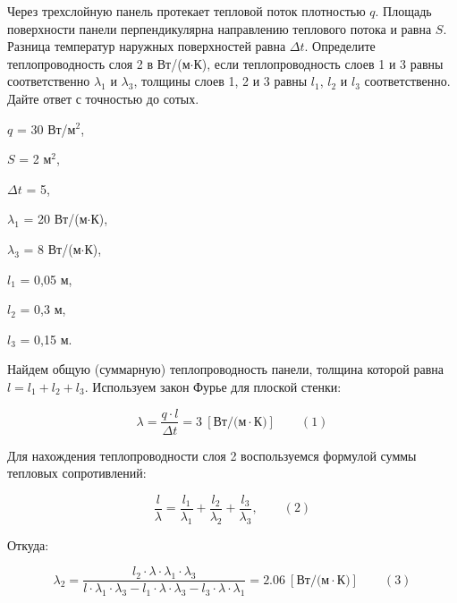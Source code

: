 

Через трехслойную панель протекает тепловой поток плотностью
$q$. Площадь поверхности
панели перпендикулярна направлению теплового потока и равна $S$. Разница температур наружных
поверхностей равна $\Delta t$. Определите
теплопроводность слоя 2 в Вт/(м$\cdot$К), если теплопроводность слоев 1 и 3 равны соответственно
$\lambda_1$ и $\lambda_3$, толщины слоев 1, 2 и 3 равны $l_1$, $l_2$ и $l_3$ соответственно. 
Дайте ответ с точностью до сотых.

$q$ = 30 Вт/м$^2$, 

$S$ = 2 м$^2$, 

$\Delta t$ = 5, 

$\lambda_1$ = 20 Вт/(м$\cdot$К),

$\lambda_3$ = 8 Вт/(м$\cdot$К), 

$l_1$ = 0,05 м, 

$l_2$ = 0,3 м, 

$l_3$ = 0,15 м.

\explanationSection

Найдем общую (суммарную) теплопроводность панели, толщина 
которой равна $l=l_1+l_2+l_3$. Используем закон Фурье для плоской стенки:

$$\lambda=\frac{q \cdot l}{\Delta t}=3 \: [\text{Вт⁄(м} \cdot \text{К})] \qquad (1)$$

Для нахождения теплопроводности слоя 2 воспользуемся формулой суммы тепловых сопротивлений:

$$\frac{l}{\lambda}=\frac{l_1}{\lambda_1}+\frac{l_2}{\lambda_2}+\frac{l_3}{\lambda_3}, \qquad (2)$$

Откуда:

$$\lambda_2=\frac{l_2 \cdot \lambda \cdot \lambda_1 \cdot \lambda_3}{l \cdot \lambda_1 \cdot \lambda_3-l_1 \cdot \lambda \cdot \lambda_3-l_3 \cdot \lambda \cdot \lambda_1}=2.06 \: [\text{Вт⁄(м} \cdot \text{К})] \qquad (3)$$

